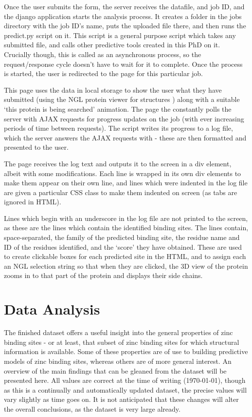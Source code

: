 Once the user submits the form, the server receives the datafile, and job ID, and the django application starts the analysis process. It creates a folder in the jobs directory with the job ID's name, puts the uploaded file there, and then runs the predict.py script on it. This script is a general purpose script which takes any submitted file, and calls other predictive tools created in this PhD on it. Crucially though, this is called as an asynchronous process, so the request/response cycle doesn't have to wait for it to complete. Once the process is started, the user is redirected to the page for this particular job.

This page uses the data in local storage to show the user what they have submitted (using the NGL protein viewer for structures ) along with a suitable `this protein is being searched' animation. The page the constantly polls the server with AJAX requests for progress updates on the job (with ever increasing periods of time between requests). The script writes its progress to a log file, which the server answers the AJAX requests with - these are then formatted and presented to the user.

The page receives the log text and outputs it to the screen in a div element, albeit with some modifications. Each line is wrapped in its own div elements to make them appear on their own line, and lines which were indented in the log file are given a particular CSS class to make them indented on screen (as tabs are ignored in HTML).

Lines which begin with an underscore in the log file are not printed to the screen, as these are the lines which contain the identified binding sites. The lines contain, space-separated, the family of the predicted binding site, the residue name and ID of the residues identified, and the `score' they have obtained. These are used to create clickable boxes for each predicted site in the HTML, and to assign each an NGL selection string so that when they are clicked, the 3D view of the protein zooms in to that part of the protein and displays their side chains.



\section{Data Analysis}

The finished dataset offers a useful insight into the general properties of zinc binding sites - or at least, that subset of zinc binding sites for which structural information is available. Some of these properties are of use to building predictive models of zinc binding sites, whereas others are of more general interest. An overview of the main findings that can be gleaned from the dataset will be presented here. All values are correct at the time of writing ({\today}), though as this is a continually and automatically updated dataset, the precise values will vary slightly as time goes on. It is not anticipated that these changes will alter the overall conclusions, as the dataset is very large already.

